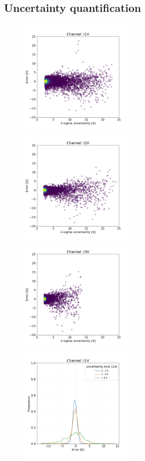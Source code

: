 \documentclass[amt, manuscript]{copernicus}
\begin{document}
\subsection{Uncertainty quantification}
%
\begin{figure}[t]
	\includegraphics[height=57mm]{Figures/scatter_uncertainty_single_I1V.png} 
	\includegraphics[height=57mm]{Figures/scatter_uncertainty_single_I2V.png}
	\includegraphics[height=57mm]{Figures/scatter_uncertainty_single_I3V.png} \\
	\includegraphics[height=57mm]{Figures/Frequency_uncertainty_bins_I1V_single.png} 

\end{figure}
\end{document}
